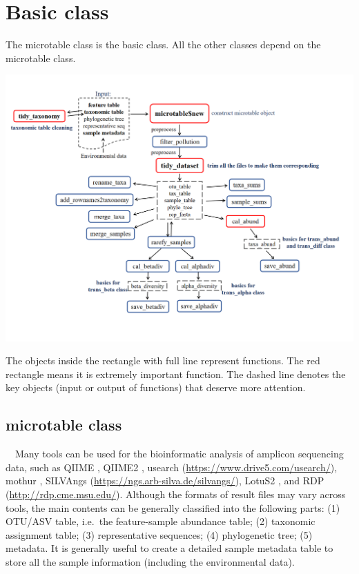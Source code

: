 \documentclass[
]{book}
\begin{document}
\hypertarget{basic-class}{%
\chapter{Basic class}\label{basic-class}}

The microtable class is the basic class.
All the other classes depend on the microtable class.

\begin{center}\includegraphics[width=8000px]{Images/microtable_framework} \end{center}

The objects inside the rectangle with full line represent functions.
The red rectangle means it is extremely important function.
The dashed line denotes the key objects (input or output of functions) that deserve more attention.

\hypertarget{microtable-class}{%
\section{microtable class}\label{microtable-class}}

　Many tools can be used for the bioinformatic analysis of amplicon sequencing data, such as QIIME \citep{Caporaso_QIIME_2010}, QIIME2 \citep{Bolyen_Reproducible_2019},
usearch (\url{https://www.drive5.com/usearch/}), mothur \citep{Schloss_Introducing_2009},
SILVAngs (\url{https://ngs.arb-silva.de/silvangs/}), LotuS2 \citep{Ozkurt_LotuS2_2022},
and RDP (\url{http://rdp.cme.msu.edu/}).
Although the formats of result files may vary across tools, the main contents can be generally classified into the following parts:
(1) OTU/ASV table, i.e.~the feature-sample abundance table;
(2) taxonomic assignment table;
(3) representative sequences;
(4) phylogenetic tree;
(5) metadata.
It is generally useful to create a detailed sample metadata table to store all the sample information (including the environmental data).
\end{document}
